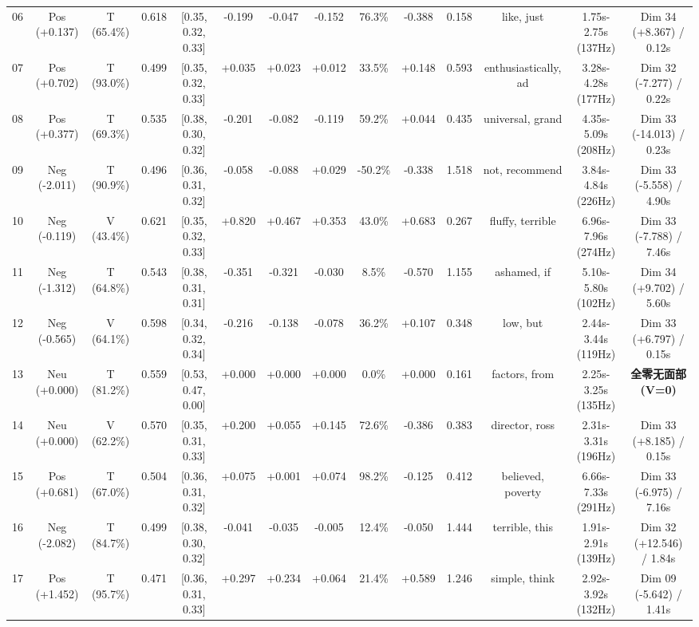 \documentclass{huawei-mcm}
\begin{document}
\begin{table}[htbp]
{\begin{tabular}{cccccccccccccc}
    06 & Pos (+0.137) & T (65.4\%) & 0.618 & [0.35, 0.32, 0.33] & -0.199 & -0.047 & -0.152 & 76.3\% & -0.388 & 0.158 & like, just & 1.75s-2.75s (137Hz) & Dim 34 (+8.367) / 0.12s \\
    07 & Pos (+0.702) & T (93.0\%) & 0.499 & [0.35, 0.32, 0.33] & +0.035 & +0.023 & +0.012 & 33.5\% & +0.148 & 0.593 & enthusiastically, ad & 3.28s-4.28s (177Hz) & Dim 32 (-7.277) / 0.22s \\
    08 & Pos (+0.377) & T (69.3\%) & 0.535 & [0.38, 0.30, 0.32] & -0.201 & -0.082 & -0.119 & 59.2\% & +0.044 & 0.435 & universal, grand & 4.35s-5.09s (208Hz) & Dim 33 (-14.013) / 0.23s \\
    09 & Neg (-2.011) & T (90.9\%) & 0.496 & [0.36, 0.31, 0.32] & -0.058 & -0.088 & +0.029 & -50.2\% & -0.338 & 1.518 & not, recommend & 3.84s-4.84s (226Hz) & Dim 33 (-5.558) / 4.90s \\
    10 & Neg (-0.119) & V (43.4\%) & 0.621 & [0.35, 0.32, 0.33] & +0.820 & +0.467 & +0.353 & 43.0\% & +0.683 & 0.267 & fluffy, terrible & 6.96s-7.96s (274Hz) & Dim 33 (-7.788) / 7.46s \\
    11 & Neg (-1.312) & T (64.8\%) & 0.543 & [0.38, 0.31, 0.31] & -0.351 & -0.321 & -0.030 & 8.5\% & -0.570 & 1.155 & ashamed, if & 5.10s-5.80s (102Hz) & Dim 34 (+9.702) / 5.60s \\
    12 & Neg (-0.565) & V (64.1\%) & 0.598 & [0.34, 0.32, 0.34] & -0.216 & -0.138 & -0.078 & 36.2\% & +0.107 & 0.348 & low, but & 2.44s-3.44s (119Hz) & Dim 33 (+6.797) / 0.15s \\
    13 & Neu (+0.000) & T (81.2\%) & 0.559 & [0.53, 0.47, 0.00] & +0.000 & +0.000 & +0.000 & 0.0\% & +0.000 & 0.161 & factors, from & 2.25s-3.25s (135Hz) & \textbf{全零无面部(V=0)} \\
    14 & Neu (+0.000) & V (62.2\%) & 0.570 & [0.35, 0.31, 0.33] & +0.200 & +0.055 & +0.145 & 72.6\% & -0.386 & 0.383 & director, ross & 2.31s-3.31s (196Hz) & Dim 33 (+8.185) / 0.15s \\
    15 & Pos (+0.681) & T (67.0\%) & 0.504 & [0.36, 0.31, 0.32] & +0.075 & +0.001 & +0.074 & 98.2\% & -0.125 & 0.412 & believed, poverty & 6.66s-7.33s (291Hz) & Dim 33 (-6.975) / 7.16s \\
    16 & Neg (-2.082) & T (84.7\%) & 0.499 & [0.38, 0.30, 0.32] & -0.041 & -0.035 & -0.005 & 12.4\% & -0.050 & 1.444 & terrible, this & 1.91s-2.91s (139Hz) & Dim 32 (+12.546) / 1.84s \\
    17 & Pos (+1.452) & T (95.7\%) & 0.471 & [0.36, 0.31, 0.33] & +0.297 & +0.234 & +0.064 & 21.4\% & +0.589 & 1.246 & simple, think & 2.92s-3.92s (132Hz) & Dim 09 (-5.642) / 1.41s \\

\end{tabular}}
\end{table}
\end{document}
